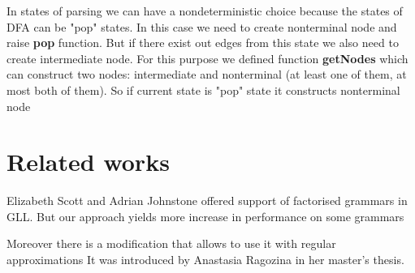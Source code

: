 \documentclass[runningheads,a4paper]{llncs}
\begin{document}
In states of parsing we can have a nondeterministic choice because the states of DFA can be "pop" states.
In this case we need to create nonterminal node and raise \textbf{pop} function. But if there exist out edges from this state we also need to create intermediate node.
For this purpose we defined function \textbf{getNodes} which can construct two nodes: intermediate and nonterminal (at least one of them, at most both of them).
So if current state is "pop" state it constructs nonterminal node

\vspace{6cm}







\section{Related works}%

Elizabeth Scott and Adrian Johnstone offered support of factorised grammars in GLL\cite{scott2016structuring}. 
But our approach yields more increase in performance on some grammars

Moreover there is a modification that allows to use it with regular approximations It was introduced by 
Anastasia Ragozina in her master's thesis.






\end{document}
